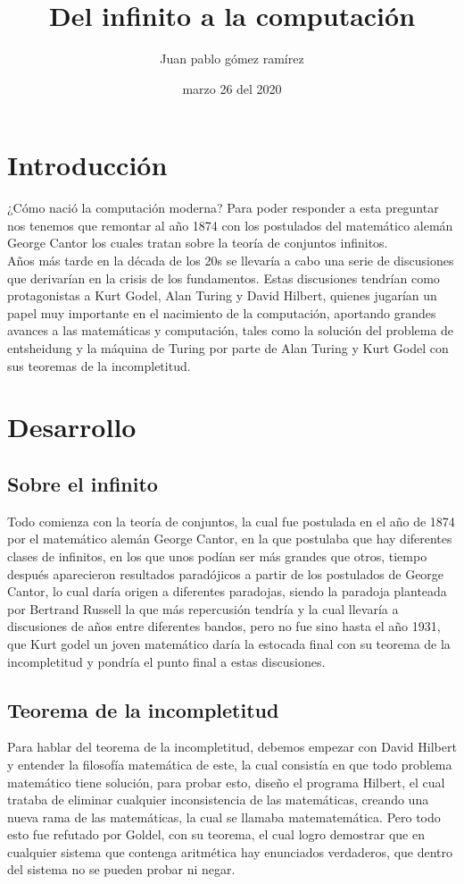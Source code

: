 \documentclass[12pt]{article}
\title{Del infinito a la computación }
\author{Juan pablo gómez ramírez }
\date{marzo 26 del 2020}
\begin{document}
\maketitle

\section{Introducción}
     ¿Cómo nació la computación moderna? Para poder responder a esta preguntar nos tenemos que remontar al   año 1874 con los postulados del matemático  alemán George Cantor los cuales tratan  sobre la teoría de conjuntos infinitos. \\
     Años más tarde en la década de los 20s se llevaría a cabo una serie de discusiones que derivarían en la crisis de los fundamentos. Estas discusiones tendrían como protagonistas a Kurt Godel, Alan Turing y David Hilbert, quienes jugarían un papel muy importante en el nacimiento de la computación, aportando grandes avances a las matemáticas y computación, tales como la solución  del problema de entsheidung y la máquina de Turing por parte de Alan  Turing y Kurt Godel con sus teoremas de la incompletitud.

\section{Desarrollo}
\subsection{Sobre el infinito}
      Todo comienza con la teoría de conjuntos, la cual fue postulada en el año de 1874 por el matemático alemán George Cantor, en la que postulaba que hay diferentes clases de infinitos, en los que unos podían ser más grandes que otros, tiempo después aparecieron resultados paradójicos a partir de los postulados de George Cantor, lo cual daría origen a diferentes paradojas, siendo la paradoja planteada por Bertrand Russell la que más  repercusión tendría y la cual llevaría a  discusiones de años entre diferentes bandos, pero no fue sino hasta el año 1931, que Kurt godel un joven matemático daría la estocada final con su teorema de la incompletitud y pondría el punto final a estas discusiones.
\subsection{Teorema de la incompletitud}
      Para hablar del teorema de la incompletitud, debemos empezar con David Hilbert y  entender la filosofía matemática de este, la cual consistía en que todo problema matemático tiene solución, para probar esto, diseño el programa Hilbert, el cual trataba de eliminar cualquier inconsistencia de las matemáticas, creando una nueva rama de las matemáticas, la cual se llamaba matematemática. Pero todo esto fue refutado por Goldel, con su teorema, el cual logro demostrar que en cualquier sistema que contenga aritmética hay enunciados verdaderos, que dentro del sistema no se pueden probar ni negar.
\end{document}
